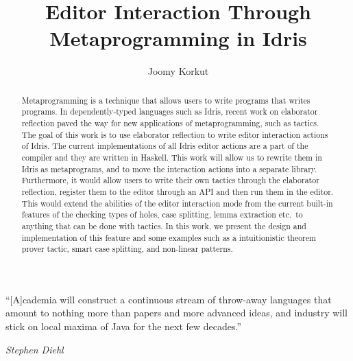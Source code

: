 \documentclass[11pt, ma]{westhesis}
\title{Editor Interaction Through Metaprogramming in Idris}
\author{Joomy Korkut}
\theoremstyle{plain}
\theoremstyle{definition}
\begin{document}
\begin{abstract}
  Metaprogramming is a technique that allows users to write programs that
  writes programs. In dependently-typed languages such as Idris, recent work on
  elaborator reflection paved the way for new applications of
  metaprogramming, such as tactics. The goal of this work is to use
  elaborator reflection to write editor interaction actions of Idris.
  The current implementations of all Idris editor actions are a part of the
  compiler and they are written in Haskell. This work will allow us to rewrite
  them in Idris as metaprograms, and to move the interaction actions into a
  separate library.
  Furthermore, it would allow users to write their own
  tactics through the elaborator reflection, register them to the editor
  through an API and then run them in the editor. This would extend the
  abilities of the editor interaction mode from the current built-in features
  of the checking types of holes, case splitting, lemma extraction etc.\ to
  anything that can be done with tactics.
  In this work, we present the design and implementation of this feature
  and some examples such as a intuitionistic theorem prover tactic,
  smart case splitting, and non-linear patterns.
\end{abstract}

\begin{dedication}
  \epigraph{``[A]cademia will construct a continuous stream of throw-away
  languages that amount to nothing more than papers and more advanced ideas,
  and industry will stick on local maxima of Java for the next few
  decades.''}{\textit{Stephen Diehl}}
\end{dedication}

\begin{acknowledgements}
\end{acknowledgements}

\frontmatter
\maketitle
\makeabstract

\tableofcontents

\mainmatter








% 
% 


\end{document}
